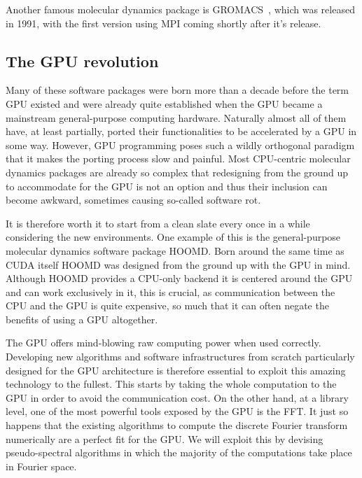 \documentclass[ twoside,openright,titlepage,numbers=noenddot,%
headinclude,footinclude,cleardoublepage=empty,abstract=on,
BCOR=5mm,paper=b5,fontsize=11pt, dvipsnames
]{scrreprt}
\newcommand{\gpu}{\gls{GPU}\xspace}
\begin{document}
Another famous molecular dynamics package is GROMACS~\cite{Berendsen1995}, which was released in 1991, with the first version using MPI coming shortly after it's release.

\subsection*{The GPU revolution}
Many of these software packages were born more than a decade before the term \gpu existed and were already quite established when the \gpu became a mainstream general-purpose computing hardware. Naturally almost all of them have, at least partially, ported their functionalities to be accelerated by a \gpu in some way. However, \gpu programming poses such a wildly orthogonal paradigm that it makes the porting process slow and painful. Most CPU-centric molecular dynamics packages are already so complex that redesigning from the ground up to accommodate for the \gpu is not an option and thus their inclusion can become awkward, sometimes causing so-called software rot.

It is therefore worth it to start from a clean slate every once in a while considering the new environments. One example of this is the general-purpose molecular dynamics software package HOOMD\cite{Anderson2008}. Born around the same time as CUDA itself HOOMD was designed from the ground up with the \gpu in mind. Although HOOMD provides a CPU-only backend it is centered around the \gpu and can work exclusively in it, this is crucial, as communication between the CPU and the \gpu is quite expensive, so much that it can often negate the benefits of using a \gpu altogether.

The \gpu offers mind-blowing raw computing power when used correctly. Developing new algorithms and software infrastructures from scratch particularly designed for the \gpu architecture is therefore essential to exploit this amazing technology to the fullest. This starts by taking the whole computation to the \gpu in order to avoid the communication cost. On the other hand, at a library level, one of the most powerful tools exposed by the \gpu is the \gls{FFT}. It just so happens that the existing algorithms to compute the discrete Fourier transform numerically are a perfect fit for the \gpu. We will exploit this by devising pseudo-spectral algorithms in which the majority of the computations take place in Fourier space.
\end{document}

